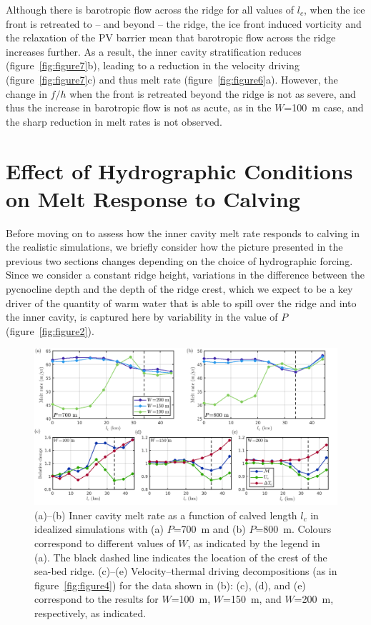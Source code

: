 \documentclass[draft]{agujournal2019}
\begin{document}
Although there is barotropic flow across the ridge for all values of $l_c$, when the ice front is retreated to -- and beyond -- the ridge, the ice front induced vorticity and the relaxation of the PV barrier mean that barotropic flow across the ridge increases further. As a result, the inner cavity stratification reduces (figure~\ref{fig:figure7}b), leading to a reduction in the velocity driving (figure~\ref{fig:figure7}c) and thus melt rate (figure~\ref{fig:figure6}a). However, the change in $f/h$ when the front is retreated beyond the ridge is not as severe, and thus the increase in barotropic flow is not as acute, as in the $W$=100~m case, and the sharp reduction in melt rates is not observed.



\section{Effect of Hydrographic Conditions on Melt Response to Calving}\label{S:Results:P}
Before moving on to assess how the inner cavity melt rate responds to calving in the realistic simulations, we briefly consider how the picture presented in the previous two sections changes depending on the choice of hydrographic forcing. Since we consider a constant ridge height, variations in the difference between the pycnocline depth and the depth of the ridge crest, which we expect to be a key driver of the quantity of warm water that is able to spill over the ridge and into the inner cavity, is captured here by variability in the value of $P$ (figure~\ref{fig:figure2}).

\begin{figure}
    \centering
    \includegraphics[width = \textwidth]{../make_figures/plots/figure8.png}
    \caption{(a)--(b) Inner cavity melt rate as a function of calved length $l_c$ in idealized simulations with (a) $P$=700~m and (b) $P$=800~m. Colours correspond to different values of $W$, as indicated by the legend in (a). The black dashed line indicates the location of the crest of the sea-bed ridge. (c)--(e) Velocity--thermal driving decompositions (as in figure~\ref{fig:figure4}) for the data shown in (b): (c), (d), and (e) correspond to the results for $W$=100~m, $W$=150~m, and $W$=200~m, respectively, as indicated.}
    \label{fig:figure8}
\end{figure}
\end{document}
